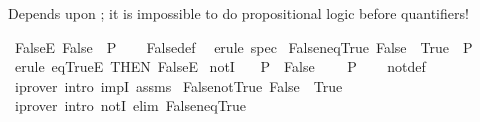 \begin{isabellebody}
%
\endisatagdocument
{\isafolddocument}%
%
\isadelimdocument
%
\endisadelimdocument
%
\begin{isamarkuptext}%
Depends upon ; it is impossible to do propositional
  logic before quantifiers!%
\end{isamarkuptext}\isamarkuptrue%
\isamarkupfalse%
\ FalseE{\isacharcolon}{\kern0pt}\ {\isachardoublequoteopen}False\ {\isasymLongrightarrow}\ P{\isachardoublequoteclose}\isanewline
%
\isadelimproof
\ \ %
\endisadelimproof
%
\isatagproof
{}\isamarkupfalse%
\ False{\isacharunderscore}{\kern0pt}def\ \isamarkupfalse%
\ {\isacharparenleft}{\kern0pt}erule\ spec{\isacharparenright}{\kern0pt}%
\endisatagproof
{\isafoldproof}%
%
\isadelimproof
\isanewline
%
\endisadelimproof
\isanewline
{}\isamarkupfalse%
\ False{\isacharunderscore}{\kern0pt}neq{\isacharunderscore}{\kern0pt}True{\isacharcolon}{\kern0pt}\ {\isachardoublequoteopen}False\ {\isacharequal}{\kern0pt}\ True\ {\isasymLongrightarrow}\ P{\isachardoublequoteclose}\isanewline
%
\isadelimproof
\ \ %
\endisadelimproof
%
\isatagproof
{}\isamarkupfalse%
\ {\isacharparenleft}{\kern0pt}erule\ eqTrueE\ {\isacharbrackleft}{\kern0pt}THEN\ FalseE{\isacharbrackright}{\kern0pt}{\isacharparenright}{\kern0pt}%
\endisatagproof
{\isafoldproof}%
%
\isadelimproof
%
\endisadelimproof
%
\isadelimdocument
%
\endisadelimdocument
%
\isatagdocument
%
\isamarkuptrue%
%
\endisatagdocument
{\isafolddocument}%
%
\isadelimdocument
%
\endisadelimdocument
{}\isamarkupfalse%
\ notI{\isacharcolon}{\kern0pt}\isanewline
\ \ \ {\isachardoublequoteopen}P\ {\isasymLongrightarrow}\ False{\isachardoublequoteclose}\isanewline
\ \ \ {\isachardoublequoteopen}{\isasymnot}\ P{\isachardoublequoteclose}\isanewline
%
\isadelimproof
\ \ %
\endisadelimproof
%
\isatagproof
{}\isamarkupfalse%
\ not{\isacharunderscore}{\kern0pt}def\ \isamarkupfalse%
\ {\isacharparenleft}{\kern0pt}iprover\ intro{\isacharcolon}{\kern0pt}\ impI\ assms{\isacharparenright}{\kern0pt}%
\endisatagproof
{\isafoldproof}%
%
\isadelimproof
\isanewline
%
\endisadelimproof
\isanewline
{}\isamarkupfalse%
\ False{\isacharunderscore}{\kern0pt}not{\isacharunderscore}{\kern0pt}True{\isacharcolon}{\kern0pt}\ {\isachardoublequoteopen}False\ {\isasymnoteq}\ True{\isachardoublequoteclose}\isanewline
%
\isadelimproof
\ \ %
\endisadelimproof
%
\isatagproof
{}\isamarkupfalse%
\ {\isacharparenleft}{\kern0pt}iprover\ intro{\isacharcolon}{\kern0pt}\ notI\ elim{\isacharcolon}{\kern0pt}\ False{\isacharunderscore}{\kern0pt}neq{\isacharunderscore}{\kern0pt}True{\isacharparenright}{\kern0pt}%

\end{isabellebody}
